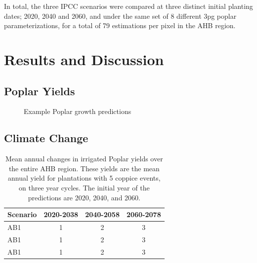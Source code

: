 \documentclass[preprint,12pt]{elsarticle}
\begin{document}
{In total, the three \ac{IPCC} scenarios were compared at three
distinct initial planting dates; 2020, 2040 and 2060, and under the
same set of 8 different \ac{3pg} poplar parameterizations, for a total
of 79 estimations per pixel in the \ac{AHB} region.  

\section{Results and Discussion}

\subsection{Poplar Yields}
\label{sec:yield}

\begin{figure}[hp]
  \centering
  
  \caption{Example Poplar growth predictions}
  \label{fig:examples}
\end{figure}



    

\subsection{Climate Change}
\label{sec:climate-change}


\begin{table}[hp]
  \centering
  \begin{tabular}{|l|c|c|c|}
    \hline
    Scenario & 2020-2038 & 2040-2058 & 2060-2078 \\
    \hline
    \ac{AB1} & 1 & 2 & 3 \\
    \ac{AB1} & 1 & 2 & 3 \\
    \ac{AB1} & 1 & 2 & 3 \\
    \hline    
  \end{tabular}
  \caption{Mean annual changes in irrigated Poplar yields  over the entire \ac{AHB} region.  
These yields are the mean annual yield for plantations with 5 coppice events, on three year cycles.
The initial year of the predictions are 2020, 2040, and 2060.}
  \label{tab:potential}
\end{table}

}
\end{document}
